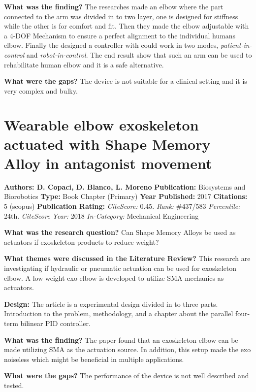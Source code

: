\textbf{What was the finding?} 
The researches made an elbow where the part connected to the arm was divided in to two layer, one is designed for stiffness while the other is for comfort and fit. Then they made the elbow adjustable with a 4-DOF Mechanism to ensure a perfect alignment to the individual humans elbow. Finally the designed a controller with could work in two modes, \textit{patient-in-control} and \textit{robot-in-control}. The end result show that such an arm can be used to rehabilitate human elbow and it is a safe alternative. 

\textbf{What were the gaps?}   
The device is not suitable for a clinical setting and it is very complex and bulky. 

\section{Wearable elbow exoskeleton actuated with Shape Memory Alloy in antagonist movement}
\textbf{Authors: D. Copaci, D. Blanco, L. Moreno}  \newline
\textbf{Publication:} Biosystems and Biorobotics 
\textbf{Type:} Book Chapter (Primary)  \newline 
\textbf{Year Published: } 2017  
\textbf{Citations:} 5 (scopus) \newline 
\textbf{Publication Rating:}    
\textit{CiteScore:} 0.45. \textit{Rank:} \#437/583 \textit{Percentile:} 24th. \newline
\textit{CiteScore Year:} 2018
\textit{In-Category:} Mechanical Engineering

\textbf{What was the research question?}
Can Shape Memory Alloys be used as actuators if exoskeleton products to reduce weight? 

\textbf{What themes were discussed in the Literature Review?} 
This research are investigating if hydraulic or pneumatic actuation can be used for exoskeleton elbow. A low weight exo elbow is developed to utilize SMA mechanics as actuators. 

\textbf{Design:}  
The article is a experimental design divided in to three parts. Introduction to the problem, methodology, and a chapter about the parallel four-term bilinear PID controller. 

\textbf{What was the finding?} 
The paper found that an exoskeleton elbow can be made utilizing SMA as the actuation source. In addition, this setup made the exo noiseless which might be beneficial in multiple applications. 

\textbf{What were the gaps?}  
The performance of the device is not well described and tested. 

